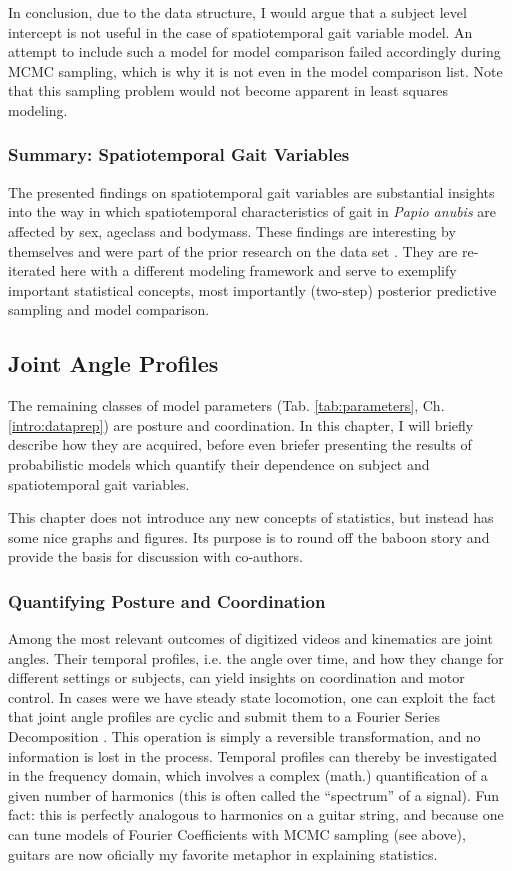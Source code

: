 In conclusion, due to the data structure, I would argue that a subject level intercept is not useful in the case of spatiotemporal gait variable model.
An attempt to include such a model for model comparison failed accordingly during MCMC sampling, which is why it is not even in the model comparison list.
Note that this sampling problem would not become apparent in least squares modeling.


\subsubsection{Summary: Spatiotemporal Gait Variables}
\label{sec:org0d94e4f}
The presented findings on spatiotemporal gait variables are substantial insights into the way in which spatiotemporal characteristics of gait in \emph{Papio anubis} are affected by sex, ageclass and bodymass.
These findings are interesting by themselves and were part of the prior research on the data set \citep[][]{Druelle2021}.
They are re-iterated here with a different modeling framework and serve to exemplify important statistical concepts, most importantly (two-step) posterior predictive sampling and model comparison.

\FloatBarrier\clearpage
\subsection{Joint Angle Profiles}
\label{sec:orgc82aa48}
The remaining classes of model parameters (Tab. \ref{tab:parameters}, Ch. \ref{intro:dataprep}) are posture and coordination.
In this chapter, I will briefly describe how they are acquired, before even briefer presenting the results of probabilistic models which quantify their dependence on subject and spatiotemporal gait variables.


This chapter does not introduce any new concepts of statistics, but instead has some nice graphs and figures.
Its purpose is to round off the baboon story and provide the basis for discussion with co-authors.


\subsubsection{Quantifying Posture and Coordination}
\label{sec:orgb18a99b}
Among the most relevant outcomes of digitized videos and kinematics are joint angles.
Their temporal profiles, i.e. the angle over time, and how they change for different settings or subjects, can yield insights on coordination and motor control.
In cases were we have steady state locomotion, one can exploit the fact that joint angle profiles are cyclic and submit them to a Fourier Series Decomposition \citep[\emph{cf.}][]{Mielke2019}.
This operation is simply a reversible transformation, and no information is lost in the process.
Temporal profiles can thereby be investigated in the frequency domain, which involves a complex (math.) quantification of a given number of harmonics (this is often called the ``spectrum'' of a signal).
Fun fact: this is perfectly analogous to harmonics on a guitar string, and because one can tune models of Fourier Coefficients with MCMC sampling (see above), guitars are now oficially my favorite metaphor in explaining statistics.

